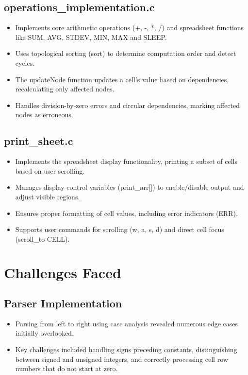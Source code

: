\documentclass{article}
\begin{document}
\subsection{operations\_implementation.c}
\begin{itemize}
    \item Implements core arithmetic operations (+, -, *, /) and spreadsheet functions like SUM, AVG, STDEV, MIN, MAX and SLEEP.
    \item Uses topological sorting (sort) to determine computation order and detect cycles.
    \item The updateNode function updates a cell’s value based on dependencies, recalculating only affected nodes.
    \item Handles division-by-zero errors and circular dependencies, marking affected nodes as erroneous.
\end{itemize}

\subsection{print\_sheet.c}
\begin{itemize}
    \item Implements the spreadsheet display functionality, printing a subset of cells based on user scrolling.
    \item Manages display control variables (print\_arr[]) to enable/disable output and adjust visible regions.
    \item Ensures proper formatting of cell values, including error indicators (ERR).
    \item Supports user commands for scrolling (w, a, s, d) and direct cell focus (scroll\_to \<CELL\>).
\end{itemize}

\section{Challenges Faced}

\subsection{Parser Implementation}
\begin{itemize}
    \item Parsing from left to right using case analysis revealed numerous edge cases initially overlooked.
    \item Key challenges included handling signs preceding constants, distinguishing between signed and unsigned integers, and correctly processing cell row numbers that do not start at zero.
\end{itemize}
\end{document}
